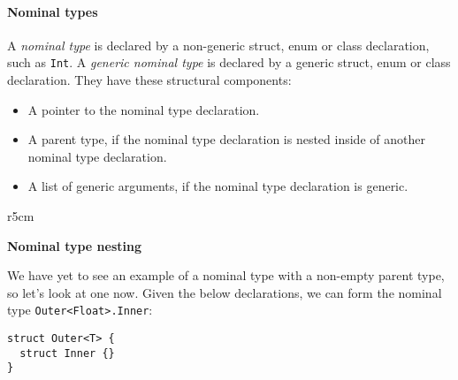 \documentclass[../generics]{subfiles}
\begin{document}
\paragraph{Nominal types}
A \emph{nominal type} is declared by a non-generic struct, enum or class declaration, such as \texttt{Int}. A \emph{generic nominal type} is declared by a generic struct, enum or class declaration. They have these structural components:
\begin{itemize}
\item A pointer to the nominal type declaration.
\item A parent type, if the nominal type declaration is nested inside of another nominal type declaration.
\item A list of generic arguments, if the nominal type declaration is generic.
\end{itemize}

\begin{wrapfigure}[9]{r}{5cm}
\begin{center}\textbf{Nominal type nesting}\end{center}
\end{wrapfigure}

We have yet to see an example of a nominal type with a non-empty parent type, so let's look at one now. Given the below declarations, we can form the nominal type \texttt{Outer<Float>.Inner}:

\medskip

\noindent
\begin{minipage}{24em}
\begin{Verbatim}
struct Outer<T> {
  struct Inner {}
}
\end{Verbatim}
\end{minipage}
\end{document}
